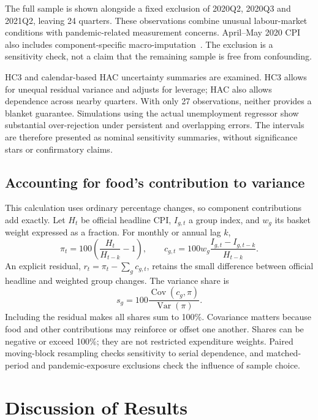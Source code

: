 \documentclass[11pt,a4paper]{article}
\begin{document}
The full sample is shown alongside a fixed exclusion of 2020Q2, 2020Q3 and 2021Q2, leaving 24 quarters. These observations combine unusual labour-market conditions with pandemic-related measurement concerns. April--May 2020 CPI also includes component-specific macro-imputation~\cite{imputation}. The exclusion is a sensitivity check, not a claim that the remaining sample is free from confounding.

HC3 and calendar-based HAC uncertainty summaries are examined. HC3 allows for unequal residual variance and adjusts for leverage; HAC also allows dependence across nearby quarters. With only 27 observations, neither provides a blanket guarantee. Simulations using the actual unemployment regressor show substantial over-rejection under persistent and overlapping errors. The intervals are therefore presented as nominal sensitivity summaries, without significance stars or confirmatory claims.

\subsection{Accounting for food's contribution to variance}

This calculation uses ordinary percentage changes, so component contributions add exactly. Let $H_t$ be official headline CPI, $I_{g,t}$ a group index, and $w_g$ its basket weight expressed as a fraction. For monthly or annual lag $k$,
\begin{equation}
\pi_t=100\left(\frac{H_t}{H_{t-k}}-1\right),\qquad
c_{g,t}=100w_g\frac{I_{g,t}-I_{g,t-k}}{H_{t-k}}.
\label{eq:contributions}
\end{equation}
An explicit residual, $r_t=\pi_t-\sum_g c_{g,t}$, retains the small difference between official headline and weighted group changes. The variance share is
\begin{equation}
s_g=100\frac{\operatorname{Cov}(c_g,\pi)}{\operatorname{Var}(\pi)}.
\label{eq:variance}
\end{equation}
Including the residual makes all shares sum to 100\%. Covariance matters because food and other contributions may reinforce or offset one another. Shares can be negative or exceed 100\%; they are not restricted expenditure weights. Paired moving-block resampling checks sensitivity to serial dependence, and matched-period and pandemic-exposure exclusions check the influence of sample choice.

\clearpage
\section{Discussion of Results}
\end{document}

